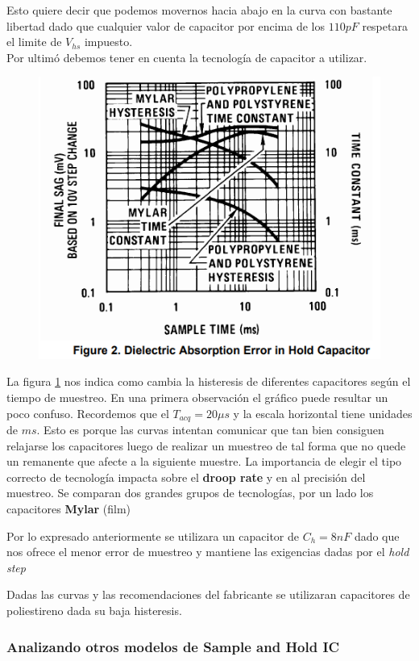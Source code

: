 Esto quiere decir que podemos movernos hacia abajo en la curva con bastante libertad dado que cualquier valor de capacitor por encima de los $110pF$ respetara el limite de $V_{hs}$ impuesto.\\
Por ultimó debemos tener en cuenta la tecnología de capacitor a utilizar.
\begin{figure}[H]
	\centering
	\includegraphics[scale=0.7]{ImagenesEjercicio4/AbsorcionDielectrico}
	\caption{}
	\label{fig:absorciondielectrico}
\end{figure}
La figura \ref{fig:absorciondielectrico} nos indica como cambia la histeresis de diferentes capacitores según el tiempo de muestreo. En una primera observación el gráfico puede resultar un poco confuso. Recordemos que el $T_{acq}=20\mu s$ y la escala horizontal tiene unidades de $ms$. Esto es porque las curvas intentan comunicar que tan bien consiguen relajarse los capacitores luego de realizar un muestreo de tal forma que no quede un remanente que afecte a la siguiente muestre.
La importancia de elegir el tipo correcto de tecnología impacta sobre el \textbf{droop rate} y en al precisión del muestreo. Se comparan dos grandes grupos de tecnologías, por un lado los capacitores \textbf{Mylar} (film)

Por lo expresado anteriormente se utilizara un capacitor de $C_h = 8nF$ dado que nos ofrece el menor error de muestreo y mantiene las exigencias dadas por el \textit{hold step}

Dadas las curvas y las recomendaciones del fabricante se utilizaran capacitores de poliestireno dada su baja histeresis.

\subsubsection{Analizando otros modelos de Sample and Hold IC}



